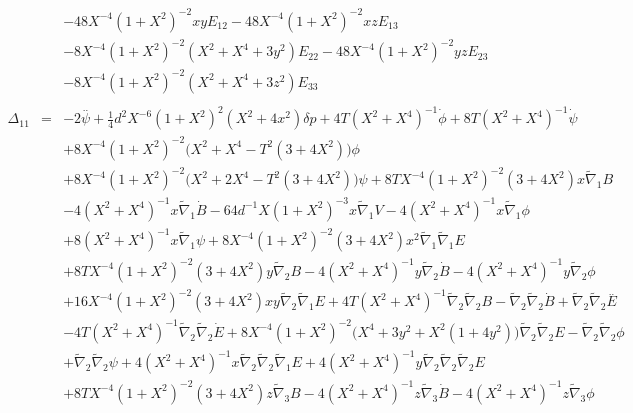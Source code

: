 \documentclass[10pt,letterpaper]{article}
\numberwithin{equation}{section}
\begin{document}
\begin{appendices}
\begin{eqnarray}
&& - 48 X^{-4} (1 + X^2)^{-2} x y E_{12} - 48 X^{-4} (1 + X^2)^{-2} x z E_{13} \nonumber \\ 
&& - 8 X^{-4} (1 + X^2)^{-2} (X^2 + X^4 + 3 y^2) E_{22} - 48 X^{-4} (1 + X^2)^{-2} y z E_{23} \nonumber \\ 
&& - 8 X^{-4} (1 + X^2)^{-2} (X^2 + X^4 + 3 z^2) E_{33}
\\  \nonumber\\ 
\Delta_{11}&=& -2 \overset{..}{\psi} + \tfrac{1}{4} d^2 X^{-6} (1 + X^2)^2 (X^2 + 4 x^2) \delta p + 4 T (X^2 + X^4)^{-1} \dot{\phi} + 8 T (X^2 + X^4)^{-1} \dot{\psi} \nonumber \\ 
&& + 8 X^{-4} (1 + X^2)^{-2} \bigl(X^2 + X^4 -  T^2 (3 + 4 X^2)\bigr) \phi \nonumber \\ 
&& + 8 X^{-4} (1 + X^2)^{-2} \bigl(X^2 + 2 X^4 -  T^2 (3 + 4 X^2)\bigr) \psi + 8 T X^{-4} (1 + X^2)^{-2} (3 + 4 X^2) x \tilde{\nabla}_{1}B \nonumber \\ 
&& - 4 (X^2 + X^4)^{-1} x \tilde{\nabla}_{1}\dot{B} - 64 d^{-1} X (1 + X^2)^{-3} x \tilde{\nabla}_{1}V - 4 (X^2 + X^4)^{-1} x \tilde{\nabla}_{1}\phi \nonumber \\ 
&& + 8 (X^2 + X^4)^{-1} x \tilde{\nabla}_{1}\psi + 8 X^{-4} (1 + X^2)^{-2} (3 + 4 X^2) x^2 \tilde{\nabla}_{1}\tilde{\nabla}_{1}E \nonumber \\ 
&& + 8 T X^{-4} (1 + X^2)^{-2} (3 + 4 X^2) y \tilde{\nabla}_{2}B - 4 (X^2 + X^4)^{-1} y \tilde{\nabla}_{2}\dot{B} - 4 (X^2 + X^4)^{-1} y \tilde{\nabla}_{2}\phi \nonumber \\ 
&& + 16 X^{-4} (1 + X^2)^{-2} (3 + 4 X^2) x y \tilde{\nabla}_{2}\tilde{\nabla}_{1}E + 4 T (X^2 + X^4)^{-1} \tilde{\nabla}_{2}\tilde{\nabla}_{2}B -  \tilde{\nabla}_{2}\tilde{\nabla}_{2}\dot{B} + \tilde{\nabla}_{2}\tilde{\nabla}_{2}\overset{..}{E} \nonumber \\ 
&& - 4 T (X^2 + X^4)^{-1} \tilde{\nabla}_{2}\tilde{\nabla}_{2}\dot{E} + 8 X^{-4} (1 + X^2)^{-2} \bigl(X^4 + 3 y^2 + X^2 (1 + 4 y^2)\bigr) \tilde{\nabla}_{2}\tilde{\nabla}_{2}E -  \tilde{\nabla}_{2}\tilde{\nabla}_{2}\phi \nonumber \\ 
&& + \tilde{\nabla}_{2}\tilde{\nabla}_{2}\psi + 4 (X^2 + X^4)^{-1} x \tilde{\nabla}_{2}\tilde{\nabla}_{2}\tilde{\nabla}_{1}E + 4 (X^2 + X^4)^{-1} y \tilde{\nabla}_{2}\tilde{\nabla}_{2}\tilde{\nabla}_{2}E \nonumber \\ 
&& + 8 T X^{-4} (1 + X^2)^{-2} (3 + 4 X^2) z \tilde{\nabla}_{3}B - 4 (X^2 + X^4)^{-1} z \tilde{\nabla}_{3}\dot{B} - 4 (X^2 + X^4)^{-1} z \tilde{\nabla}_{3}\phi \nonumber \\ 

\end{eqnarray}
\end{appendices}
\end{document}
